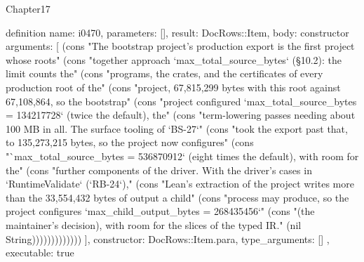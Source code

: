 \begin{lexlean}{Chapter17}
\begin{semanticmodule}
definition{
  name: i0470,
  parameters: [],
  result: DocRows::Item,
  body: constructor{
    arguments: [
      (cons "The bootstrap project's production export is the first project whose roots" (cons "together approach `max_total_source_bytes` (§10.2): the limit counts the" (cons "programs, the crates, and the certificates of every production root of the" (cons "project, 67,815,299 bytes with this root against 67,108,864, so the bootstrap" (cons "project configured `max_total_source_bytes = 134217728` (twice the default), the" (cons "term-lowering passes needing about 100 MB in all. The surface tooling of `BS-27`" (cons "took the export past that, to 135,273,215 bytes, so the project now configures" (cons "`max_total_source_bytes = 536870912` (eight times the default), with room for the" (cons "further components of the driver. With the driver's cases in `RuntimeValidate` (`RB-24`)," (cons "Lean's extraction of the project writes more than the 33,554,432 bytes of output a child" (cons "process may produce, so the project configures `max_child_output_bytes = 268435456`" (cons "(the maintainer's decision), with room for the slices of the typed IR." (nil String)))))))))))))
    ],
    constructor: DocRows::Item.para,
    type_arguments: []
  },
  executable: true
}


\end{semanticmodule}
\end{lexlean}

